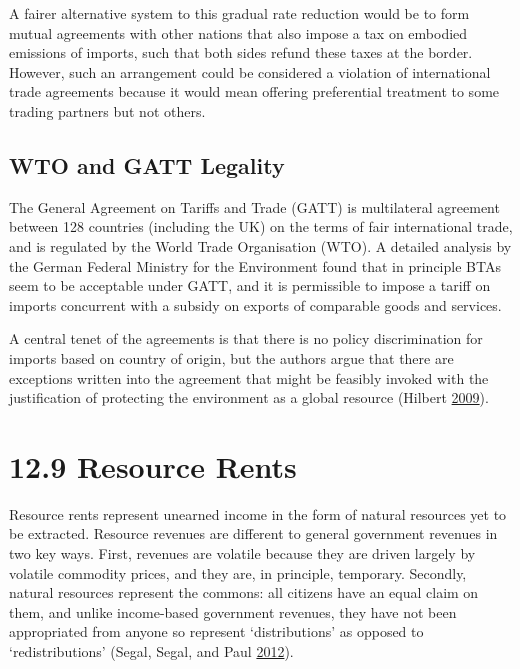 \documentclass[]{tufte-handout}
\begin{document}
A fairer alternative system to this gradual rate reduction would be to
form mutual agreements with other nations that also impose a tax on
embodied emissions of imports, such that both sides refund these taxes
at the border. However, such an arrangement could be considered a
violation of international trade agreements because it would mean
offering preferential treatment to some trading partners but not others.

\hypertarget{wto-and-gatt-legality}{%
\subsection{WTO and GATT Legality}\label{wto-and-gatt-legality}}

The General Agreement on Tariffs and Trade (GATT) is multilateral
agreement between 128 countries (including the UK) on the terms of fair
international trade, and is regulated by the World Trade Organisation
(WTO). A detailed analysis by the German Federal Ministry for the
Environment found that in principle BTAs seem to be acceptable under
GATT, and it is permissible to impose a tariff on imports concurrent
with a subsidy on exports of comparable goods and services.

A central tenet of the agreements is that there is no policy
discrimination for imports based on country of origin, but the authors
argue that there are exceptions written into the agreement that might be
feasibly invoked with the justification of protecting the environment as
a global resource (Hilbert \protect\hyperlink{ref-Hilbert2009}{2009}).

\hypertarget{resource-rents}{%
\section{12.9 Resource Rents}\label{resource-rents}}

Resource rents represent unearned income in the form of natural
resources yet to be extracted. Resource revenues are different to
general government revenues in two key ways. First, revenues are
volatile because they are driven largely by volatile commodity prices,
and they are, in principle, temporary. Secondly, natural resources
represent the commons: all citizens have an equal claim on them, and
unlike income-based government revenues, they have not been appropriated
from anyone so represent `distributions' as opposed to `redistributions'
(Segal, Segal, and Paul \protect\hyperlink{ref-Segal2012}{2012}).
\end{document}

